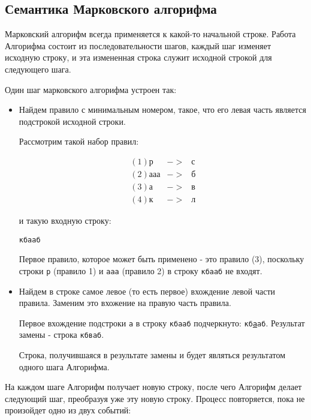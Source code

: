 \documentclass[12pt,a4paper,oneside]{article}
\newcommand{\s}[1]{\texttt{#1}}
\begin{document}
\subsection{Семантика Марковского алгорифма}

Марковский алгорифм всегда применяется к какой-то начальной строке. 
Работа Алгорифма состоит из последовательности шагов, каждый шаг 
изменяет исходную строку, и эта измененная строка служит исходной строкой 
для следующего шага.

\vspace{3 mm}
Один шаг марковского алгорифма устроен так: 
\begin{itemize}
\item Найдем правило с минимальным номером, такое, что его левая 
часть является подстрокой исходной строки.

\begin{example}Рассмотрим такой набор правил:
\begin{bnf}\begin{eqnarray*}
   (1) \s{р}&->&\s{с}\\
   (2) \s{ааа}&->&\s{б}\\
   (3) \s{а}&->&\s{в}\\
   (4) \s{к}&->&\s{л}
\end{eqnarray*}\end{bnf}  
и такую входную строку:\begin{center}\s{кбааб}\end{center}

Первое правило, которое может быть применено - это правило (3), поскольку
строки \s{р} (правило 1) и \s{ааа} (правило 2) в строку 
\s{кбааб} не входят. 
\end{example}

\item Найдем в строке самое левое (то есть первое) вхождение левой части 
правила. Заменим это вхожение на правую часть правила. 

\begin{example}
   Первое вхождение подстроки \s{а} в строку \s{кбааб} подчеркнуто: 
   \s{кб\underline{а}аб}. Результат замены - строка \s{кбваб}. 
\end{example}

Строка, получившаяся в результате замены и будет являться результатом одного
шага Алгорифма.

\end{itemize}

На каждом шаге Алгорифм получает новую строку,
после чего Алгорифм делает следующий шаг, преобразуя уже эту новую строку.
Процесс повторяется, пока не произойдет одно из двух событий:
\end{document}
